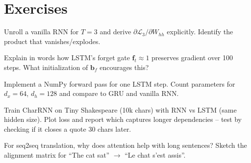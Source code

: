 \section{Exercises}
\begin{exercise} Unroll a vanilla RNN for $T=3$ and derive $\partial\mathcal{L}_3/\partial W_{hh}$ explicitly. Identify the product that vanishes/explodes.\end{exercise}
\begin{exercise} Explain in words how LSTM's forget gate $\mathbf{f}_t\approx1$ preserves gradient over 100 steps. What initialization of $\mathbf{b}_f$ encourages this?\end{exercise}
\begin{exercise} Implement a NumPy forward pass for one LSTM step. Count parameters for $d_x=64$, $d_h=128$ and compare to GRU and vanilla RNN.\end{exercise}
\begin{exercise} Train CharRNN on Tiny Shakespeare (10k chars) with RNN vs LSTM (same hidden size). Plot loss and report which captures longer dependencies -- test by checking if it closes a quote 30 chars later.\end{exercise}
\begin{exercise} For seq2seq translation, why does attention help with long sentences? Sketch the alignment matrix for ``The cat sat'' $\to$ ``Le chat s'est assis''.\end{exercise}
